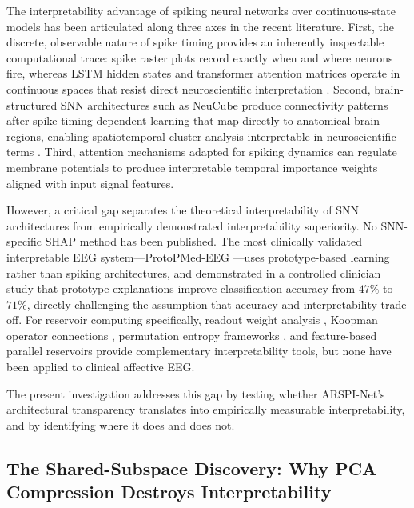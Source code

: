 The interpretability advantage of spiking neural networks over continuous-state models has been articulated along three axes in the recent literature. First, the discrete, observable nature of spike timing provides an inherently inspectable computational trace: spike raster plots record exactly when and where neurons fire, whereas LSTM hidden states and transformer attention matrices operate in continuous spaces that resist direct neuroscientific interpretation \cite{kim_sam_2021}. Second, brain-structured SNN architectures such as NeuCube \cite{kasabov_neucube_2014} produce connectivity patterns after spike-timing-dependent learning that map directly to anatomical brain regions, enabling spatiotemporal cluster analysis interpretable in neuroscientific terms \cite{doborjeh_explainable_2021}. Third, attention mechanisms adapted for spiking dynamics \cite{yao_attention_snn_2023} can regulate membrane potentials to produce interpretable temporal importance weights aligned with input signal features.

However, a critical gap separates the theoretical interpretability of SNN architectures from empirically demonstrated interpretability superiority. No SNN-specific SHAP method has been published. The most clinically validated interpretable EEG system---ProtoPMed-EEG \cite{barnett_protopmed_2024}---uses prototype-based learning rather than spiking architectures, and demonstrated in a controlled clinician study that prototype explanations improve classification accuracy from $47\%$ to $71\%$, directly challenging the assumption that accuracy and interpretability trade off. For reservoir computing specifically, readout weight analysis \cite{alao_discovering_2021}, Koopman operator connections \cite{gulina_koopman_2021}, permutation entropy frameworks \cite{reservoir_pe_2022}, and feature-based parallel reservoirs \cite{goswami_feature_esn_2024} provide complementary interpretability tools, but none have been applied to clinical affective EEG.

The present investigation addresses this gap by testing whether ARSPI-Net's architectural transparency translates into empirically measurable interpretability, and by identifying where it does and does not.

\subsection{The Shared-Subspace Discovery: Why PCA Compression Destroys Interpretability}
\label{sec:shared_subspace}

